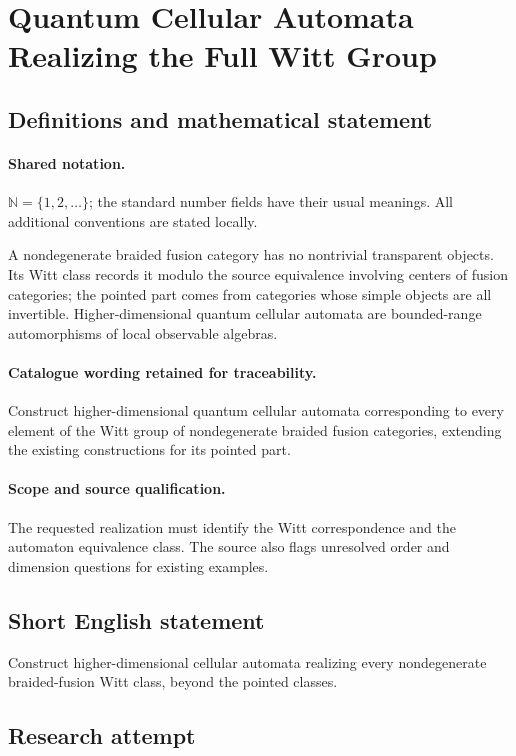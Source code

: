\documentclass[11pt]{article}
\begin{document}
\section{Quantum Cellular Automata Realizing the Full Witt Group}\label{statement}

\subsection{Definitions and mathematical statement}

\paragraph{Shared notation.}$\mathbb N=\{1,2,\ldots\}$; the standard number fields have their usual meanings. All additional conventions are stated locally.


A nondegenerate braided fusion category has no nontrivial transparent objects. Its Witt class records it modulo the source equivalence involving centers of fusion categories; the pointed part comes from categories whose simple objects are all invertible. Higher-dimensional quantum cellular automata are bounded-range automorphisms of local observable algebras.

\paragraph{Catalogue wording retained for traceability.}
Construct higher-dimensional quantum cellular automata corresponding to every element of the Witt group of nondegenerate braided fusion categories, extending the existing constructions for its pointed part.

\paragraph{Scope and source qualification.}The requested realization must identify the Witt correspondence and the automaton equivalence class. The source also flags unresolved order and dimension questions for existing examples.
\subsection{Short English statement}
Construct higher-dimensional cellular automata realizing every nondegenerate braided-fusion Witt class, beyond the pointed classes.
\subsection{Research attempt}
\end{document}
